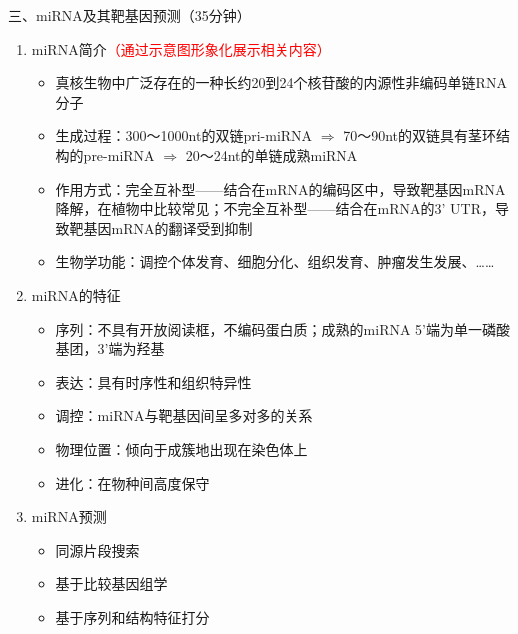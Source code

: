 \documentclass{TIJMUjiaoanLL}
\begin{document}
\noindent
三、miRNA及其靶基因预测（35分钟）
\begin{enumerate}
  \item miRNA简介\textcolor{red}{（通过示意图形象化展示相关内容）}
    \begin{itemize}
      \item 真核生物中广泛存在的一种长约20到24个核苷酸的内源性非编码单链RNA分子
      \item 生成过程：300～1000nt的双链pri-miRNA $\Rightarrow$ 70～90nt的双链具有茎环结构的pre-miRNA $\Rightarrow$ 20～24nt的单链成熟miRNA
      \item 作用方式：完全互补型——结合在mRNA的编码区中，导致靶基因mRNA降解，在植物中比较常见；不完全互补型——结合在mRNA的3' UTR，导致靶基因mRNA的翻译受到抑制
      \item 生物学功能：调控个体发育、细胞分化、组织发育、肿瘤发生发展、……
    \end{itemize}
  \item miRNA的特征
    \begin{itemize}
      \item 序列：不具有开放阅读框，不编码蛋白质；成熟的miRNA 5'端为单一磷酸基团，3'端为羟基
      \item 表达：具有时序性和组织特异性
      \item 调控：miRNA与靶基因间呈多对多的关系
      \item 物理位置：倾向于成簇地出现在染色体上
      \item 进化：在物种间高度保守
    \end{itemize}
  \item miRNA预测
    \begin{itemize}
      \item 同源片段搜索
      \item 基于比较基因组学
      \item 基于序列和结构特征打分

\end{itemize}
\end{enumerate}
\end{document}
